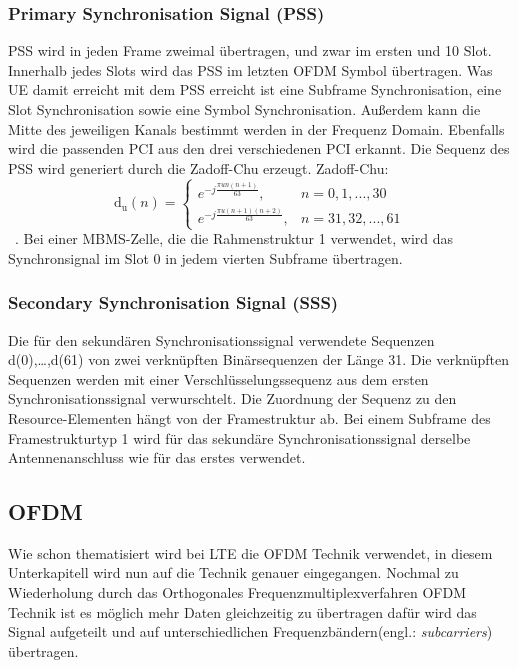 \subsubsection{Primary Synchronisation Signal (PSS)}
 PSS wird in jeden Frame zweimal übertragen, und zwar im ersten und 10 Slot. Innerhalb jedes Slots wird das PSS im letzten OFDM Symbol übertragen. Was UE damit erreicht mit dem PSS erreicht ist eine Subframe Synchronisation, eine Slot Synchronisation sowie eine Symbol Synchronisation. Außerdem kann die Mitte des jeweiligen Kanals bestimmt werden in der Frequenz Domain. Ebenfalls wird die passenden PCI aus den drei verschiedenen PCI erkannt.
 Die Sequenz des PSS wird generiert durch die Zadoff-Chu erzeugt. Zadoff-Chu:
\begin{equation}
    \operatorname{d_u}(n)=\begin{cases} e^{-j\frac{\pi un(n+1)}{63}}, & n=0,1,...,30 \\ e^{-j\frac{\pi u(n+1)(n+2)}{63}}, & n=31,32,...,61 \end{cases}
\end{equation} 
~\cite[S.~181]{etsi2021136}. Bei einer MBMS-Zelle, die die Rahmenstruktur 1 verwendet, wird das Synchronsignal im Slot 0 in jedem vierten Subframe übertragen.

\subsubsection{Secondary Synchronisation Signal (SSS)}
Die für den sekundären Synchronisationssignal verwendete Sequenzen d(0),…,d(61) von zwei verknüpften Binärsequenzen der Länge 31. Die verknüpften Sequenzen werden mit einer Verschlüsselungssequenz aus dem ersten Synchronisationssignal verwurschtelt. Die Zuordnung der Sequenz zu den Resource-Elementen hängt von der Framestruktur ab. Bei einem Subframe des Framestrukturtyp 1 wird für das sekundäre Synchronisationssignal derselbe Antennenanschluss wie für das erstes verwendet. ~\cite[S.~183]{etsi2021136}

\subsection{OFDM}
Wie schon thematisiert wird bei LTE die OFDM Technik verwendet, in diesem Unterkapitell wird nun auf die Technik genauer eingegangen. Nochmal zu Wiederholung durch das Orthogonales Frequenzmultiplexverfahren OFDM Technik ist es möglich mehr Daten gleichzeitig zu übertragen dafür wird das Signal aufgeteilt und auf unterschiedlichen Frequenzbändern(engl.: \textit{subcarriers}) übertragen.


